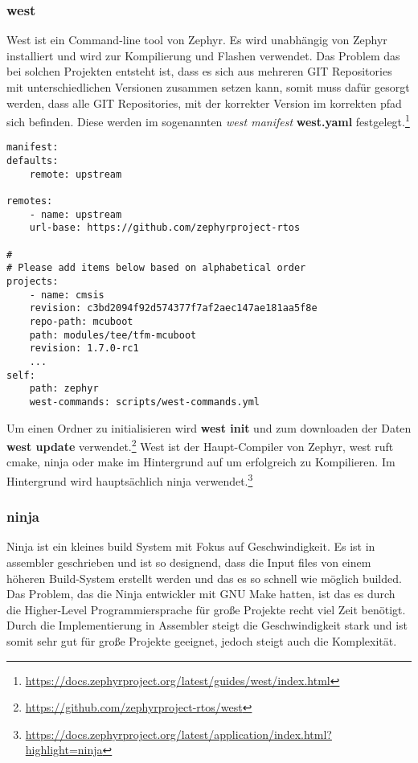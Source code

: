     \subsubsection{west}
            West ist ein Command-line tool von Zephyr. Es wird unabhängig von Zephyr installiert und wird zur Kompilierung und Flashen verwendet. 
            Das Problem das bei solchen Projekten entsteht ist, dass es sich aus mehreren GIT Repositories mit unterschiedlichen Versionen zusammen setzen kann, somit
            muss dafür gesorgt werden, dass alle GIT Repositories, mit der korrekter Version im korrekten pfad sich befinden. 
            Diese werden im sogenannten \textit{west manifest} \textbf{west.yaml} festgelegt.\footnote{\url{https://docs.zephyrproject.org/latest/guides/west/index.html}}
            \begin{lstlisting}[style=StylePython, captionpos=b, caption=west.yaml]
manifest:
defaults:
    remote: upstream

remotes:
    - name: upstream
    url-base: https://github.com/zephyrproject-rtos

#
# Please add items below based on alphabetical order
projects:
    - name: cmsis
    revision: c3bd2094f92d574377f7af2aec147ae181aa5f8e
    repo-path: mcuboot
    path: modules/tee/tfm-mcuboot
    revision: 1.7.0-rc1
    ...
self:
    path: zephyr
    west-commands: scripts/west-commands.yml    
            \end{lstlisting} 
            Um einen Ordner zu initialisieren wird \textbf{west init} und zum downloaden der Daten \textbf{west update} verwendet.\footnote{\url{https://github.com/zephyrproject-rtos/west}}
            West ist der Haupt-Compiler von Zephyr, west ruft cmake, ninja oder make im Hintergrund auf um erfolgreich zu Kompilieren. 
            Im Hintergrund wird hauptsächlich ninja verwendet.\footnote{\url{https://docs.zephyrproject.org/latest/application/index.html?highlight=ninja}}


\newpage
    \subsubsection{ninja}
        Ninja ist ein kleines build System mit Fokus auf Geschwindigkeit. 
        Es ist in assembler geschrieben und ist so designend, dass die Input files von einem höheren Build-System erstellt werden und das es so schnell wie möglich builded. 
        Das Problem, das die Ninja entwickler mit GNU Make hatten, ist das es durch die Higher-Level Programmiersprache für große Projekte recht viel Zeit benötigt. 
        Durch die Implementierung in Assembler steigt die Geschwindigkeit stark und ist somit sehr gut für große Projekte geeignet, jedoch steigt auch die Komplexität. 

